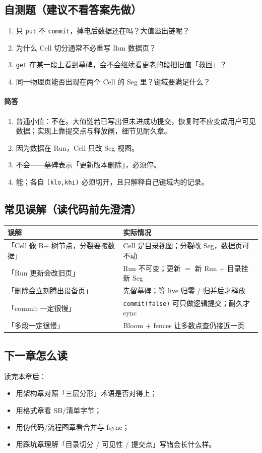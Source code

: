 \subsection{自测题（建议不看答案先做）}
\label{sec:cd-quiz}

\begin{enumerate}[leftmargin=1.6em]
  \item 只 \texttt{put} 不 \texttt{commit}，掉电后数据还在吗？大值溢出链呢？
  \item 为什么 Cell 切分通常不必重写 Run 数据页？
  \item \texttt{get} 在某一段上看到墓碑，会不会继续看更老的段把旧值「救回」？
  \item 同一物理页能否出现在两个 Cell 的 Seg 里？键域要满足什么？
\end{enumerate}

\paragraph{简答}
\begin{enumerate}[leftmargin=1.6em]
  \item 普通小值：不在。大值链若已写出但未进成功提交，恢复时不应变成用户可见数据；实现上靠提交点与释放闸，细节见耐久章。
  \item 因为数据在 Run，Cell 只改 Seg 视图。
  \item 不会——墓碑表示「更新版本删除」，必须停。
  \item 能；各自 \texttt{[klo,khi)} 必须切开，且只解释自己键域内的记录。
\end{enumerate}

\subsection{常见误解（读代码前先澄清）}
\label{sec:cd-myths}

\begin{center}
\small
\begin{tabular}{@{}p{4.2cm}p{7.6cm}@{}}
\toprule
误解 & 实际情况 \\
\midrule
「Cell 像 B+ 树节点，分裂要搬数据」 & Cell 是目录视图；分裂改 Seg，数据页可不动 \\
「Run 更新会改旧页」 & Run 不可变；更新 $=$ 新 Run + 目录挂新 Seg \\
「删除会立刻腾出设备页」 & 先留墓碑；等 live 归零 / 归并后才释放 \\
「commit 一定很慢」 & \texttt{commit(false)} 可只做逻辑提交；耐久才 sync \\
「多段一定很慢」 & Bloom + fences 让多数点查仍接近一页 \\
\bottomrule
\end{tabular}
\end{center}

\subsection{下一章怎么读}
读完本章后：
\begin{itemize}[leftmargin=1.4em]
  \item 用架构章对照「三层分形」术语是否对得上；
  \item 用格式章看 SB/清单字节；
  \item 用伪代码/流程图章看合并与 fsync；
  \item 用踩坑章理解「目录切分 / 可见性 / 提交点」写错会长什么样。
\end{itemize}
